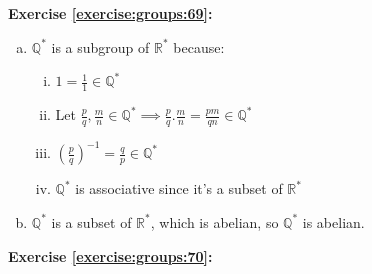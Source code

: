 \noindent\textbf{Exercise \ref{exercise:groups:69}:}
%

\begin{enumerate}[(a)]
\item
${\mathbb Q}^*$ is a subgroup of ${\mathbb R}^*$ because:
	\begin{enumerate}[(i)]
	\item
	$1=\displaystyle\frac{1}{1}\in {\mathbb Q}^*$
	
	\item
	Let $\displaystyle\frac{p}{q},\frac{m}{n}\in {\mathbb Q}^*\implies \frac{p}{q}.\frac{m}{n}=\frac{pm}{qn}\in {\mathbb Q}^*$
	
	\item
	$\left(\displaystyle\frac{p}{q}\right)^{-1}=\displaystyle{\frac{q}{p}}\in {\mathbb Q}^*$
	
	\item
	${\mathbb Q}^*$ is associative since it's a subset of ${\mathbb R}^*$
	\end{enumerate}
	
\item
${\mathbb Q}^*$ is a subset of ${\mathbb R}^*$, which is abelian, so ${\mathbb Q}^*$ is abelian.
\end{enumerate}

\noindent\textbf{Exercise \ref{exercise:groups:70}:}

